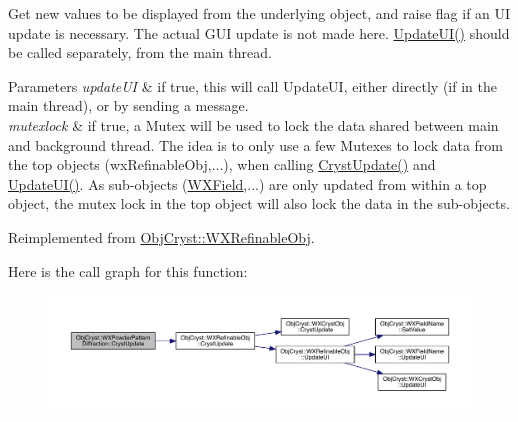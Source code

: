 Get new values to be displayed from the underlying object, and raise flag if an UI update is necessary. The actual G\+UI update is not made here. \mbox{\hyperlink{class_obj_cryst_1_1_w_x_powder_pattern_diffraction_acc1ee5836a4db2466007fe9ebb540e01}{Update\+U\+I()}} should be called separately, from the main thread.


\begin{DoxyParams}{Parameters}
{\em update\+UI} & if true, this will call Update\+UI, either directly (if in the main thread), or by sending a message. \\
\hline
{\em mutexlock} & if true, a Mutex will be used to lock the data shared between main and background thread. The idea is to only use a few Mutexes to lock data from the top objects (wx\+Refinable\+Obj,...), when calling \mbox{\hyperlink{class_obj_cryst_1_1_w_x_powder_pattern_diffraction_a1da4c9c31433e1cee6bf77afca30818e}{Cryst\+Update()}} and \mbox{\hyperlink{class_obj_cryst_1_1_w_x_powder_pattern_diffraction_acc1ee5836a4db2466007fe9ebb540e01}{Update\+U\+I()}}. As sub-\/objects (\mbox{\hyperlink{class_obj_cryst_1_1_w_x_field}{W\+X\+Field}},...) are only updated from within a top object, the mutex lock in the top object will also lock the data in the sub-\/objects. \\
\hline
\end{DoxyParams}


Reimplemented from \mbox{\hyperlink{class_obj_cryst_1_1_w_x_refinable_obj_a8249d288e62ad1ebffeea91f77ae37a3}{Obj\+Cryst\+::\+W\+X\+Refinable\+Obj}}.

Here is the call graph for this function\+:
\nopagebreak
\begin{figure}[H]
\begin{center}
\leavevmode
\includegraphics[width=350pt]{class_obj_cryst_1_1_w_x_powder_pattern_diffraction_a1da4c9c31433e1cee6bf77afca30818e_cgraph}
\end{center}
\end{figure}
\mbox{\label{class_obj_cryst_1_1_w_x_powder_pattern_diffraction_acc1ee5836a4db2466007fe9ebb540e01}} 
